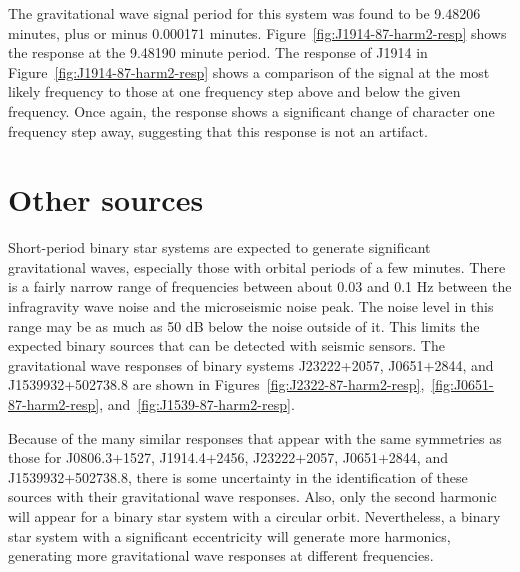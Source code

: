 

The gravitational wave signal period for this system was found to be 9.48206 minutes, plus or minus 0.000171 minutes.
Figure~\ref{fig:J1914-87-harm2-resp} shows the response at the 9.48190 minute period.
The response of J1914 in Figure~\ref{fig:J1914-87-harm2-resp} shows a comparison of the signal at the most likely frequency  to those at one frequency step above and below the given frequency.
Once again,  the  response shows a significant change of character one frequency step away, suggesting that this response is not an artifact.  



\section{Other sources}

Short-period binary star systems are expected to generate significant gravitational waves, especially those with orbital periods of a few minutes.  There is a fairly narrow range of frequencies between about 0.03 and 0.1 Hz between the infragravity wave noise and the microseismic noise peak.  The noise level in this range may be as much as 50 dB below the noise outside of it.  This limits the expected binary sources that can be detected with seismic sensors.  The gravitational wave responses of binary systems J23222+2057, J0651+2844, and J1539932+502738.8 are shown in Figures~\ref{fig:J2322-87-harm2-resp},~\ref{fig:J0651-87-harm2-resp}, and~\ref{fig:J1539-87-harm2-resp}.
 






Because of the many similar responses that appear with the same symmetries as those for J0806.3+1527, J1914.4+2456, J23222+2057, J0651+2844, and J1539932+502738.8, there is some uncertainty in the identification of these sources with their gravitational wave responses.  Also, only the second harmonic will appear for a binary star system with a circular orbit.
Nevertheless, a  binary star system with a significant eccentricity will generate more harmonics, generating more gravitational wave responses at different frequencies.


